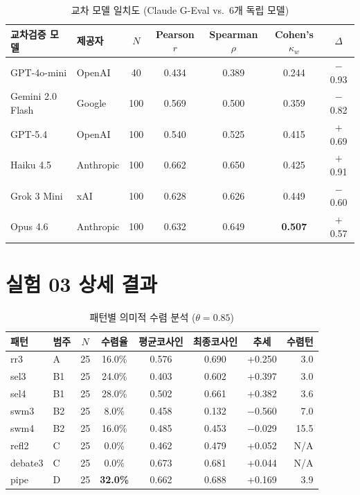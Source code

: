 \documentclass[a4paper,11pt]{article}
\begin{document}
\begin{table}[H]
\centering
\caption{교차 모델 일치도 (Claude G-Eval vs.\ 6개 독립 모델)}
\label{tab:cross-model-agreement}
{\small
\begin{tabular}{llccccc}
\toprule
교차검증 모델 & 제공자 & $N$ & Pearson $r$ & Spearman $\rho$ & Cohen's $\kappa_w$ & $\Delta$ \\
\midrule
GPT-4o-mini      & OpenAI    & 40  & 0.434 & 0.389 & 0.244 & $-$0.93 \\
Gemini 2.0 Flash & Google    & 100 & 0.569 & 0.500 & 0.359 & $-$0.82 \\
GPT-5.4          & OpenAI    & 100 & 0.540 & 0.525 & 0.415 & $+$0.69 \\
Haiku 4.5        & Anthropic & 100 & 0.662 & 0.650 & 0.425 & $+$0.91 \\
Grok 3 Mini      & xAI       & 100 & 0.628 & 0.626 & 0.449 & $-$0.60 \\
Opus 4.6         & Anthropic & 100 & 0.632 & 0.649 & \textbf{0.507} & $+$0.57 \\
\bottomrule
\end{tabular}
}
\end{table}

\section{실험 03 상세 결과}
\label{app:exp03-details}

\begin{table}[H]
\centering
\caption{패턴별 의미적 수렴 분석 ($\theta=0.85$)}
\label{tab:semantic-convergence}
{\small
\begin{tabular}{llcccccr}
\toprule
패턴 & 범주 & $N$ & 수렴율 & 평균코사인 & 최종코사인 & 추세 & 수렴턴 \\
\midrule
rr3     & A  & 25 & 16.0\% & 0.576 & 0.690 & +0.250  & 3.0 \\
sel3    & B1 & 25 & 24.0\% & 0.403 & 0.602 & +0.397  & 3.0 \\
sel4    & B1 & 25 & 28.0\% & 0.502 & 0.661 & +0.382  & 3.6 \\
swm3    & B2 & 25 & 8.0\%  & 0.458 & 0.132 & $-$0.560 & 7.0 \\
swm4    & B2 & 25 & 16.0\% & 0.485 & 0.453 & $-$0.029 & 15.5 \\
refl2   & C  & 25 & 0.0\%  & 0.462 & 0.479 & +0.052  & N/A \\
debate3 & C  & 25 & 0.0\%  & 0.673 & 0.681 & +0.044  & N/A \\
pipe    & D  & 25 & \textbf{32.0\%} & 0.662 & 0.688 & +0.169 & 3.9 \\
\bottomrule
\end{tabular}
}
\end{table}
\end{document}
